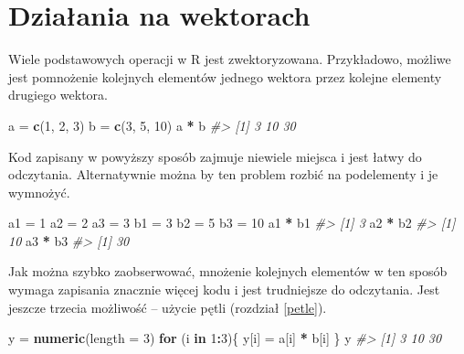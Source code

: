 \documentclass[paper=6in:9in,pagesize=pdftex,headinclude=on,footinclude=on,10pt]{scrbook}
\newenvironment{Shaded}{\begin{snugshade}}{\end{snugshade}}
\newcommand{\CommentTok}[1]{\textcolor[rgb]{0.56,0.35,0.01}{\textit{#1}}}
\newcommand{\ControlFlowTok}[1]{\textcolor[rgb]{0.13,0.29,0.53}{\textbf{#1}}}
\newcommand{\DataTypeTok}[1]{\textcolor[rgb]{0.13,0.29,0.53}{#1}}
\newcommand{\DecValTok}[1]{\textcolor[rgb]{0.00,0.00,0.81}{#1}}
\newcommand{\KeywordTok}[1]{\textcolor[rgb]{0.13,0.29,0.53}{\textbf{#1}}}
\newcommand{\NormalTok}[1]{#1}
\newcommand{\OperatorTok}[1]{\textcolor[rgb]{0.81,0.36,0.00}{\textbf{#1}}}
\newcommand{\StringTok}[1]{\textcolor[rgb]{0.31,0.60,0.02}{#1}}
\begin{document}
\hypertarget{dzialania-na-wektorach}{%
\section{Działania na wektorach}\label{dzialania-na-wektorach}}

Wiele podstawowych operacji w R jest zwektoryzowana.
Przykładowo, możliwe jest pomnożenie kolejnych elementów jednego wektora przez kolejne elementy drugiego wektora.

\begin{Shaded}
\begin{Highlighting}[]
\NormalTok{a =}\StringTok{ }\KeywordTok{c}\NormalTok{(}\DecValTok{1}\NormalTok{, }\DecValTok{2}\NormalTok{, }\DecValTok{3}\NormalTok{)}
\NormalTok{b =}\StringTok{ }\KeywordTok{c}\NormalTok{(}\DecValTok{3}\NormalTok{, }\DecValTok{5}\NormalTok{, }\DecValTok{10}\NormalTok{)}
\NormalTok{a }\OperatorTok{*}\StringTok{ }\NormalTok{b}
\CommentTok{#> [1]  3 10 30}
\end{Highlighting}
\end{Shaded}

Kod zapisany w powyższy sposób zajmuje niewiele miejsca i jest łatwy do odczytania.
Alternatywnie można by ten problem rozbić na podelementy i je wymnożyć.

\begin{Shaded}
\begin{Highlighting}[]
\NormalTok{a1 =}\StringTok{ }\DecValTok{1}
\NormalTok{a2 =}\StringTok{ }\DecValTok{2}
\NormalTok{a3 =}\StringTok{ }\DecValTok{3}
\NormalTok{b1 =}\StringTok{ }\DecValTok{3}
\NormalTok{b2 =}\StringTok{ }\DecValTok{5}
\NormalTok{b3 =}\StringTok{ }\DecValTok{10}
\NormalTok{a1 }\OperatorTok{*}\StringTok{ }\NormalTok{b1}
\CommentTok{#> [1] 3}
\NormalTok{a2 }\OperatorTok{*}\StringTok{ }\NormalTok{b2}
\CommentTok{#> [1] 10}
\NormalTok{a3 }\OperatorTok{*}\StringTok{ }\NormalTok{b3}
\CommentTok{#> [1] 30}
\end{Highlighting}
\end{Shaded}

Jak można szybko zaobserwować, mnożenie kolejnych elementów w ten sposób wymaga zapisania znacznie więcej kodu i jest trudniejsze do odczytania.
Jest jeszcze trzecia możliwość -- użycie pętli (rozdział \ref{petle}).

\begin{Shaded}
\begin{Highlighting}[]
\NormalTok{y =}\StringTok{ }\KeywordTok{numeric}\NormalTok{(}\DataTypeTok{length =} \DecValTok{3}\NormalTok{)}
\ControlFlowTok{for}\NormalTok{ (i }\ControlFlowTok{in} \DecValTok{1}\OperatorTok{:}\DecValTok{3}\NormalTok{)\{}
\NormalTok{  y[i] =}\StringTok{ }\NormalTok{a[i] }\OperatorTok{*}\StringTok{ }\NormalTok{b[i]}
\NormalTok{\}}
\NormalTok{y}
\CommentTok{#> [1]  3 10 30}
\end{Highlighting}
\end{Shaded}
\end{document}
